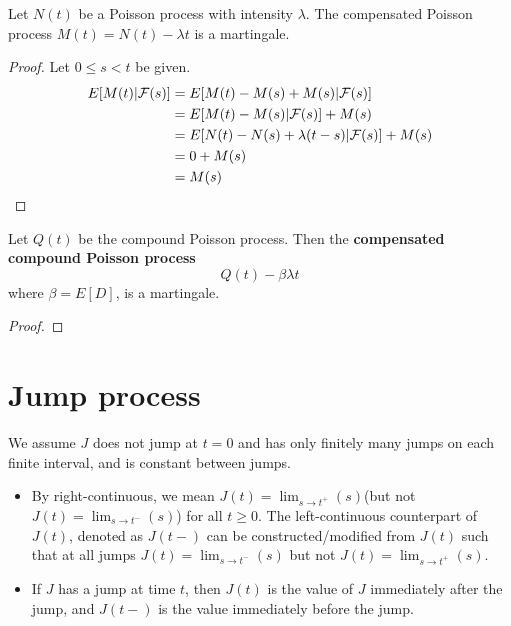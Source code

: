 \begin{refsection}
\begin{definition}
\end{definition}

\begin{lemma}\cite[467]{shreve2004stochastic2}
	Let $N(t)$ be a Poisson process with intensity $\lambda$. The compensated Poisson process $M(t) = N(t) - \lambda t$ is a martingale.
\end{lemma}
\begin{proof}
	Let $0\leq s < t$ be given. 
	\begin{align*}
	E[M(t)|\mathcal{F}(s)] &= E[M(t)- M(s) + M(s)|\mathcal{F}(s)] \\
	&= E[M(t)- M(s)|\mathcal{F}(s)] + M(s)\\
	&= E[N(t)- N(s) + \lambda(t-s)|\mathcal{F}(s)] + M(s)\\
	& = 0 + M(s) \\
	&=M(s)
	\end{align*}
\end{proof}

\begin{lemma}\cite[470]{shreve2004stochastic2}
	Let $Q(t)$ be the compound Poisson process. Then the \textbf{compensated compound Poisson process} $$Q(t) - \beta \lambda t$$
	where $\beta = E[D]$, is a martingale. 
\end{lemma}
\begin{proof}
	
\end{proof}

\section{Jump process}

\begin{definition}\cite[475]{shreve2004stochastic2}
	We assume $J$ does not jump at $t=0$ and has only finitely many jumps on each finite interval, and is constant between jumps.
\end{definition}




\begin{remark}\hfill \label{ch:theory-of-stochastic-process:remark:purejumpprocess}
	\begin{itemize}
		\item 	By right-continuous, we mean $J(t) = \lim_{s\to t^+}(s)$(but not $J(t) = \lim_{s\to t^-}(s)$) for all $t\geq 0$. The left-continuous counterpart of $J(t)$, denoted as $J(t-)$ can be constructed/modified from $J(t)$ such that at all jumps $J(t) = \lim_{s\to t^-}(s)$ but not $J(t) = \lim_{s\to t^+}(s)$. 
		\item 	If $J$ has a jump at time $t$, then $J(t)$ is the value of $J$ immediately after the jump, and $J(t-)$ is the value immediately before the jump. 
	\end{itemize}
\end{remark}


\end{refsection}
